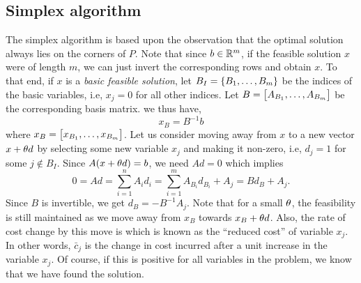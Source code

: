\documentclass[letterpaper, 10pt, twocolumn, reqno]{amsart}
\begin{document}
\subsection{Simplex algorithm}
\label{ssec:simplex}
The simplex algorithm is based upon the observation that the optimal solution always lies on the corners of $P$. Note that since $b \in \mathbb{R}^m$, if the feasible solution $x$ were of length $m$, we can just invert the corresponding rows and obtain $x$. To that end, if $x$ is a \emph{basic feasible solution}, let $B_I = \left\{B_1, \ldots, B_m\right\}$ be the indices of the basic variables, i.e, $x_j = 0$ for all other indices. Let $B = \begin{bmatrix}A_{B_1}, \ldots, A_{B_m}\end{bmatrix}$ be the corresponding basis matrix. we thus have,
$$
x_B = B^{-1} b
$$
where $x_B = \begin{bmatrix}x_{B_1}, \ldots, x_{B_m}\end{bmatrix}$.
Let us consider moving away from $x$ to a new vector $x + \theta d$ by selecting some new variable $x_j$ and making it non-zero, i.e, $d_j = 1$ for some $j \notin B_I$. Since $A(x+\theta d) = b$, we need $A d = 0$ which implies
$$
0 = A d = \sum_{i=1}^n A_i d_i = \sum_{i=1}^m A_{B_i} d_{B_i} + A_j = B d_B + A_j.
$$
Since $B$ is invertible, we get $d_B = -B^{-1} A_j$. Note that for a small $\theta$, the feasibility is still maintained as we move away from $x_B$ towards $x_B + \theta d$. Also, the rate of cost change by this move is
which is known as the ``reduced cost'' of variable $x_j$. In other words, $\bar{c}_j$ is the change in cost incurred after a unit increase in the variable $x_j$. Of course, if this is positive for all variables in the problem, we know that we have found the solution.

\end{document}
